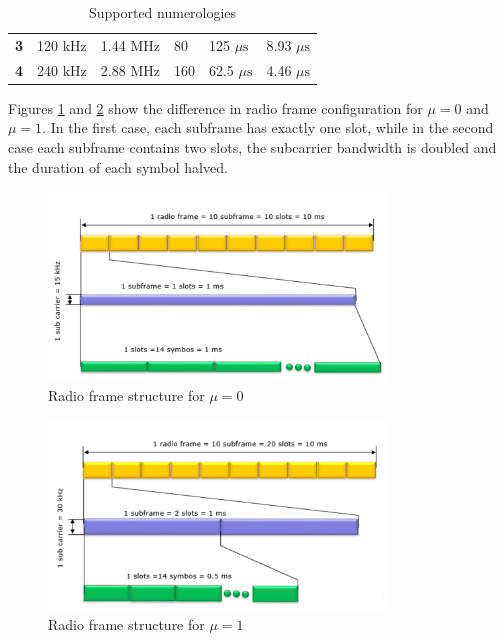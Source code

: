 \begin{table}[ht]
\begin{tabular}{l|lllll}
    \textbf{3}  & 120 kHz                                                                       & 1.44 MHz                                                                              & 80                                                                 & 125 $\mu \text{s}$                                                             & 8.93 $\mu \text{s}$                                                              \\
    \textbf{4}  & 240 kHz                                                                       & 2.88 MHz                                                                              & 160                                                                & 62.5 $\mu \text{s}$                                                            & 4.46 $\mu \text{s}$                                                             
    \end{tabular}
    \caption{Supported numerologies}
    \label{tab:mus}
    \end{table}

Figures \ref{fig:frame1} and \ref{fig:frame2} show the difference in radio frame configuration for $\mu = 0$ and $\mu = 1$. In the first case, each subframe has exactly one slot, while in the second case each subframe contains two slots, the subcarrier bandwidth is doubled and the duration of each symbol halved.

\begin{figure}[ht]
    \centering
    \includegraphics[width=0.8\textwidth]{res/frame-1.png}
    \caption{Radio frame structure for $\mu=0$ \cite{frame-5gnet}}
    \label{fig:frame1}
\end{figure}

\begin{figure}[ht]
    \centering
    \includegraphics[width=0.8\textwidth]{res/frame-2.png}
    \caption{Radio frame structure for $\mu=1$ \cite{frame-5gnet}}
    \label{fig:frame2}
\end{figure}

